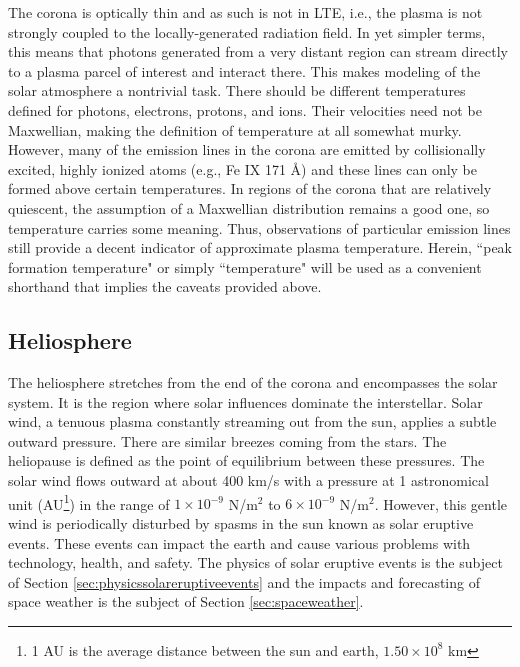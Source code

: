 The corona is optically thin and as such is not in LTE, i.e., the plasma is not strongly coupled to the locally-generated radiation field. In yet simpler terms, this means that photons generated from a very distant region can stream directly to a plasma parcel of interest and interact there. This makes modeling of the solar atmosphere a nontrivial task. There should be different temperatures defined for photons, electrons, protons, and ions. Their velocities need not be Maxwellian, making the definition of temperature at all somewhat murky. However, many of the emission lines in the corona are emitted by collisionally excited, highly ionized atoms (e.g., Fe IX 171 \AA) and these lines can only be formed above certain temperatures. In regions of the corona that are relatively quiescent, the assumption of a Maxwellian distribution remains a good one, so temperature carries some meaning. Thus, observations of particular emission lines still provide a decent indicator of approximate plasma temperature. Herein, ``peak formation temperature" or simply ``temperature" will be used as a convenient shorthand that implies the caveats provided above. 

\subsection{Heliosphere}
The heliosphere stretches from the end of the corona and encompasses the solar system. It is the region where solar influences dominate the interstellar. Solar wind, a tenuous plasma constantly streaming out from the sun, applies a subtle outward pressure. There are similar breezes coming from the stars. The heliopause is defined as the point of equilibrium between these pressures. The solar wind flows outward at about 400 km/s with a pressure at 1 astronomical unit (AU\footnote{1 AU is the average distance between the sun and earth, $1.50 \times 10^8$ km}) in the range of $1 \times 10^{-9}$  N/m$^2$ to $6 \times 10^{-9}$ N/m$^2$. However, this gentle wind is periodically disturbed by spasms in the sun known as solar eruptive events. These events can impact the earth and cause various problems with technology, health, and safety. The physics of solar eruptive events is the subject of Section \ref{sec:physicssolareruptiveevents} and the impacts and forecasting of space weather is the subject of Section \ref{sec:spaceweather}. 

